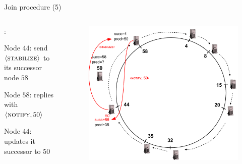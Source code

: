 \begin{frame}{Join procedure (5)}

\begin{columns}
\begin{column}{0.4\textwidth}
:
\BI
\item Node $44$: send $\langle \textsc{stabilize} \rangle$ to its successor node $58$ 
\item Node $58$: replies with  $\langle \textsc{notify}, 50 \rangle$ 
\item Node $44$: updates it successor to $50$
\EI

\end{column}
\begin{column}{0.6\textwidth}
\begin{figure}
\includegraphics[width=1.0\textwidth]{chord-example6}
\end{figure}
\end{column}
\end{columns}

\end{frame}


